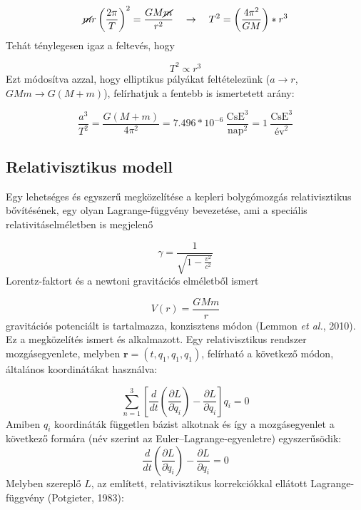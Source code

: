 \begin{multicols}{2}
\begin{equation} \label{eq:5}
    \cancel{m} r \left( \frac{2 \pi}{T} \right)^{2}
    =
    \frac{GM \cancel{m}}{r^{2}}
    \quad \to \quad
    T^{2}
    =
    \left( \frac{4 \pi^{2}}{GM} \right) * r^{3}
\end{equation}
Tehát ténylegesen igaz a feltevés, hogy

\begin{equation} \label{eq:6}
    T^{2} \propto r^{3}
\end{equation}
Ezt módosítva azzal, hogy elliptikus pályákat feltételezünk ($a \to r$, $GMm \to G \left( M + m \right)$), felírhatjuk a fentebb is ismertetett arány:

\begin{equation} \label{eq:7}
    \frac{a^{3}}{T^{2}}
    =
    \frac{G \left( M + m \right)}{4 \pi^{2}}
    =
    7.496 * 10^{-6}\ \frac{\text{CsE}^{3}}{\text{nap}^{2}}
    =
    1\ \frac{\text{CsE}^{3}}{\text{év}^{2}}
\end{equation}


\subsection{Relativisztikus modell} \label{sub:2.2}
Egy lehetséges és egyszerű megközelítése a kepleri bolygómozgás relativisztikus bővítésének, egy olyan Lagrange-függvény bevezetése, ami a speciális relativitáselméletben is megjelenő

\begin{equation} \label{eq:8}
    \gamma
    =
    \frac{1}{\sqrt{1 - \tfrac{v^{2}}{c^{2}}}}
\end{equation}
Lorentz-faktort és a newtoni gravitációs elméletből ismert

\begin{equation} \label{eq:9}
    V \left( r \right)
    =
    \frac{GMm}{r}
\end{equation}
gravitációs potenciált is tartalmazza, konzisztens módon (Lemmon \emph{et al.}, 2010\cite{2010arXiv1012.5438L}). Ez a megközelítés ismert és alkalmazott. Egy relativisztikus rendszer mozgásegyenlete, melyben $\boldsymbol{r} = \left( t, q_{1}, q_{1}, q_{1} \right)$, felírható a következő módon, általános koordinátákat használva:

\begin{equation} \label{eq:10}
    \sum_{n=1}^{3} \left[ \frac{d}{dt} \left( \frac{\partial L}{\partial \dot{q}_{i}} \right) - \frac{\partial L}{\partial q_{i}} \right] q_{i}
    =
    0
\end{equation} \label{eq:11}
Amiben $q_{i}$ koordináták független bázist alkotnak és így a mozgásegyenlet a következő formára (név szerint az Euler--Lagrange-egyenletre) egyszerűsödik:
\begin{equation}
    \frac{d}{dt} \left( \frac{\partial L}{\partial \dot{q}_{i}} \right) - \frac{\partial L}{\partial q_{i}}
    =
    0
\end{equation}
Melyben szereplő $L$, az említett, relativisztikus korrekciókkal ellátott Lagrange-függvény (Potgieter, 1983\cite{doi:10.1119/1.13441}):


\end{multicols}
